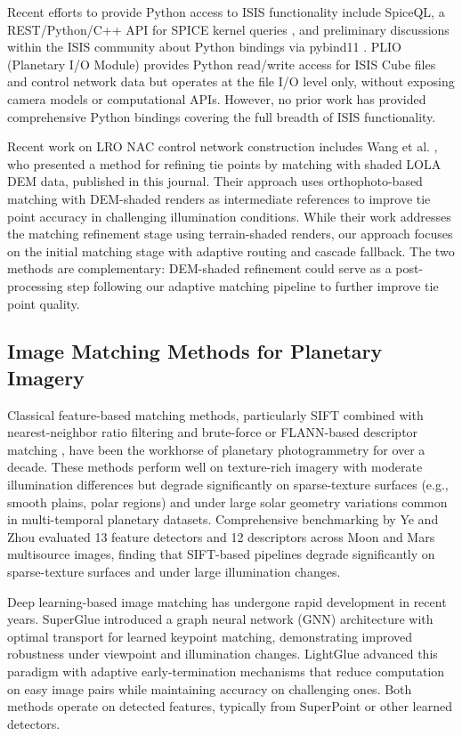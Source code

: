 \documentclass[lettersize,journal]{IEEEtran}
\begin{document}
Recent efforts to provide Python access to ISIS functionality include SpiceQL, a REST/Python/C++ API for SPICE kernel queries \cite{usgs2024spiceql}, and preliminary discussions within the ISIS community about Python bindings via pybind11 \cite{pyisis2026discussion}. PLIO (Planetary I/O Module) provides Python read/write access for ISIS Cube files and control network data but operates at the file I/O level only, without exposing camera models or computational APIs. However, no prior work has provided comprehensive Python bindings covering the full breadth of ISIS functionality.

Recent work on LRO NAC control network construction includes Wang et al. \cite{wang2025controlnet}, who presented a method for refining tie points by matching with shaded LOLA DEM data, published in this journal. Their approach uses orthophoto-based matching with DEM-shaded renders as intermediate references to improve tie point accuracy in challenging illumination conditions. While their work addresses the matching refinement stage using terrain-shaded renders, our approach focuses on the initial matching stage with adaptive routing and cascade fallback. The two methods are complementary: DEM-shaded refinement could serve as a post-processing step following our adaptive matching pipeline to further improve tie point quality.

\subsection{Image Matching Methods for Planetary Imagery}

Classical feature-based matching methods, particularly SIFT \cite{lowe2004sift} combined with nearest-neighbor ratio filtering \cite{lowe1999ratio} and brute-force or FLANN-based descriptor matching \cite{muja2009flann}, have been the workhorse of planetary photogrammetry for over a decade. These methods perform well on texture-rich imagery with moderate illumination differences but degrade significantly on sparse-texture surfaces (e.g., smooth plains, polar regions) and under large solar geometry variations common in multi-temporal planetary datasets. Comprehensive benchmarking by Ye and Zhou \cite{ye2024planetary} evaluated 13 feature detectors and 12 descriptors across Moon and Mars multisource images, finding that SIFT-based pipelines degrade significantly on sparse-texture surfaces and under large illumination changes.

Deep learning-based image matching has undergone rapid development in recent years. SuperGlue \cite{sarlin2020superglue} introduced a graph neural network (GNN) architecture with optimal transport for learned keypoint matching, demonstrating improved robustness under viewpoint and illumination changes. LightGlue \cite{lindenberger2023lightglue} advanced this paradigm with adaptive early-termination mechanisms that reduce computation on easy image pairs while maintaining accuracy on challenging ones. Both methods operate on detected features, typically from SuperPoint \cite{detone2018superpoint} or other learned detectors.
\end{document}
